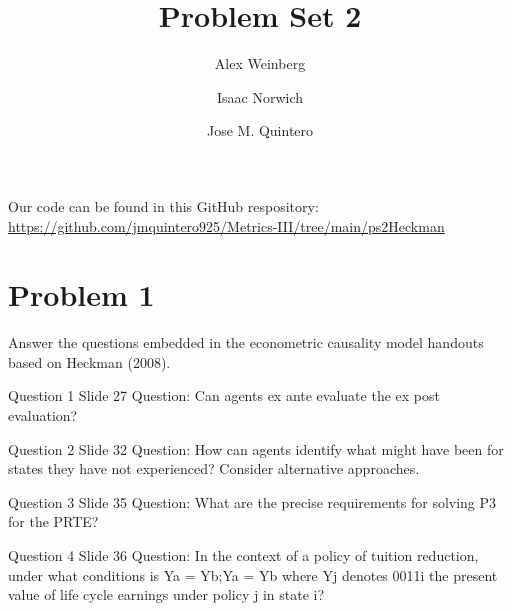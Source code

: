 \documentclass{article}
\title{Problem Set 2}
\author{Alex Weinberg \and Isaac Norwich \and Jose M. Quintero}
\begin{document}
\maketitle

\begin{comment}
Q3 - three estimators - no solutions
Q4 1 part - no solutions
Q5 no idea - no solutions
Q8 5 parts - no solutions - Isaac

Q1 7 parts - solutions
Q2 4 parts - solutions - Isaac
Q6 1 part - solutions
Q7 3 parts - solutions 

Parts:
Isaac - 5
Alex
Jose

Total of 21 parts and 2 other questions

\end{comment}


Our code can be found in this GitHub respository: \url{https://github.com/jmquintero925/Metrics-III/tree/main/ps2Heckman}


\section*{Problem 1}
Answer the questions embedded in the econometric causality model handouts based on Heckman (2008).

\begin{problem}{Question 1 Slide 27}
Question: Can agents ex ante evaluate the ex post evaluation?
\end{problem}
\begin{solution}
\end{solution}


\begin{problem}{Question 2 Slide 32}
Question: How can agents identify what might have been for states they have not experienced? Consider alternative approaches.
\end{problem}
\begin{solution}
\end{solution}
 
\begin{problem}{Question 3 Slide 35}
Question: What are the precise requirements for solving P3 for the PRTE?
\end{problem}
\begin{solution}
\end{solution}
 
 
\begin{problem}{Question 4 Slide 36}
Question: In the context of a policy of tuition reduction,
under what conditions is Ya = Yb;Ya = Yb where Yj denotes 0011i
the present value of life cycle earnings under policy j in state i?
\end{problem}
\begin{solution}
\end{solution}
\end{document}
